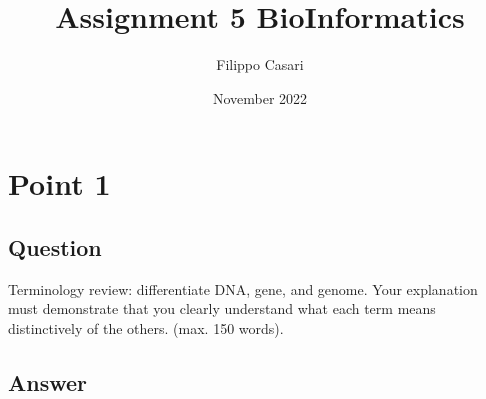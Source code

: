 \documentclass{article}
\title{Assignment 5 BioInformatics}
\author{Filippo Casari}
\date{November 2022}
\begin{document}
\maketitle

\section{Point 1}
\subsection*{Question}
Terminology review: differentiate DNA, gene, and genome. Your explanation
must demonstrate that you clearly understand what each term means distinctively
of the others. (max. 150 words).
\subsection*{Answer}
\end{document}
